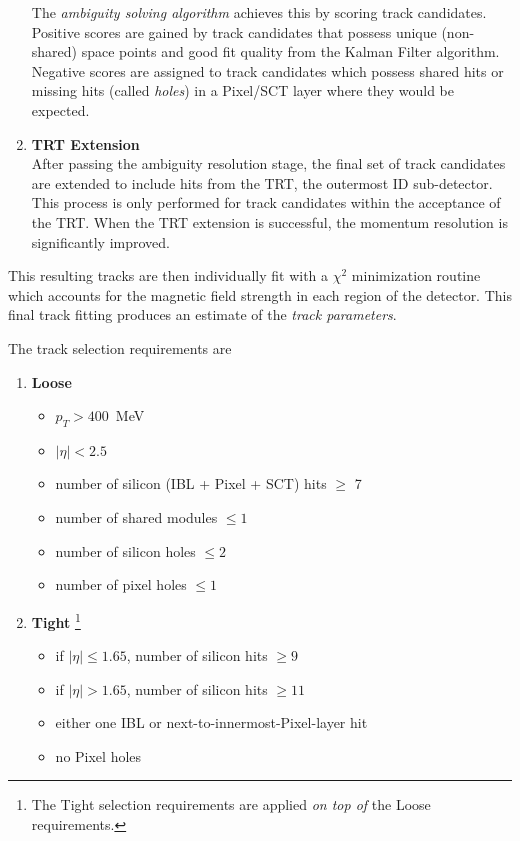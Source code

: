\begin{enumerate}
        The \textit{ambiguity solving algorithm} achieves this by scoring track candidates.
        Positive scores are gained by track candidates that possess unique (non-shared) space points and good fit quality from the Kalman Filter algorithm.
        Negative scores are assigned to track candidates which possess shared hits or missing hits (called \textit{holes}) in a Pixel/SCT layer where they would be expected.
    \item \textbf{TRT Extension}\\
        After passing the ambiguity resolution stage, the final set of track candidates are extended to include hits from the TRT, the outermost ID sub-detector.
        This process is only performed for track candidates within the acceptance of the TRT.
        When the TRT extension is successful, the momentum resolution is significantly improved.
\end{enumerate}

This resulting tracks are then individually fit with a $\chi^2$ minimization routine \cite{Cornelissen:2008zza} which accounts for the magnetic field strength in each region of the detector. This final track fitting produces an estimate of the \textit{track parameters}.

The track selection requirements are
\begin{enumerate}
    \itemsep0em 
    \item \textbf{Loose} \begin{itemize}
        \itemsep0em 
        \item $p_T > 400$\ MeV
        \item $|\eta| < 2.5$
        \item number of silicon (IBL + Pixel + SCT) hits $\geq$ 7
        \item number of shared modules $\leq 1$
        \item number of silicon holes $\leq 2$
        \item number of pixel holes $\leq 1$
    \end{itemize}
    
    \item \textbf{Tight} \footnote{The Tight selection requirements are applied \textit{on top of} the Loose requirements.} \begin{itemize}
        \itemsep0em 
        \item if $|\eta| \leq 1.65$, number of silicon hits $\geq 9$
        \item if $|\eta| > 1.65$, number of silicon hits $\geq 11$
        \item either one IBL or next-to-innermost-Pixel-layer hit
        \item no Pixel holes
    \end{itemize}
\end{enumerate}

